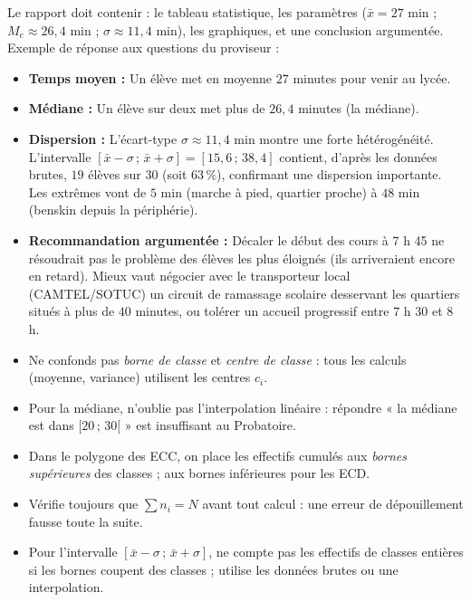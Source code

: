 \documentclass[11pt]{article}
\begin{document}
\begin{exoresolu}
Le rapport doit contenir : le tableau statistique, les paramètres ($\bar{x}=27$ min ; $M_e\approx 26,4$ min ; $\sigma\approx 11,4$ min), les graphiques, et une conclusion argumentée. Exemple de réponse aux questions du proviseur :
\begin{itemize}
\item \textbf{Temps moyen :} Un élève met en moyenne $27$ minutes pour venir au lycée.
\item \textbf{Médiane :} Un élève sur deux met plus de $26,4$ minutes (la médiane).
\item \textbf{Dispersion :} L'écart-type $\sigma\approx 11,4$ min montre une forte hétérogénéité. L'intervalle $[\bar{x}-\sigma\,;\,\bar{x}+\sigma]=[15,6\,;\,38,4]$ contient, d'après les données brutes, $19$ élèves sur $30$ (soit $63\,\%$), confirmant une dispersion importante. Les extrêmes vont de $5$ min (marche à pied, quartier proche) à $48$ min (benskin depuis la périphérie).
\item \textbf{Recommandation argumentée :} Décaler le début des cours à 7 h 45 ne résoudrait pas le problème des élèves les plus éloignés (ils arriveraient encore en retard). Mieux vaut négocier avec le transporteur local (CAMTEL/SOTUC) un circuit de ramassage scolaire desservant les quartiers situés à plus de $40$ minutes, ou tolérer un accueil progressif entre 7 h 30 et 8 h.
\end{itemize}
\end{exoresolu}

\begin{attention}
\begin{itemize}
\item Ne confonds pas \emph{borne de classe} et \emph{centre de classe} : tous les calculs (moyenne, variance) utilisent les centres $c_i$.
\item Pour la médiane, n'oublie pas l'interpolation linéaire : répondre « la médiane est dans $[20\,;\,30[$ » est insuffisant au Probatoire.
\item Dans le polygone des ECC, on place les effectifs cumulés aux \emph{bornes supérieures} des classes ; aux bornes inférieures pour les ECD.
\item Vérifie toujours que $\sum n_i = N$ avant tout calcul : une erreur de dépouillement fausse toute la suite.
\item Pour l'intervalle $[\bar{x}-\sigma\,;\,\bar{x}+\sigma]$, ne compte pas les effectifs de classes entières si les bornes coupent des classes ; utilise les données brutes ou une interpolation.
\end{itemize}
\end{attention}
\end{document}
